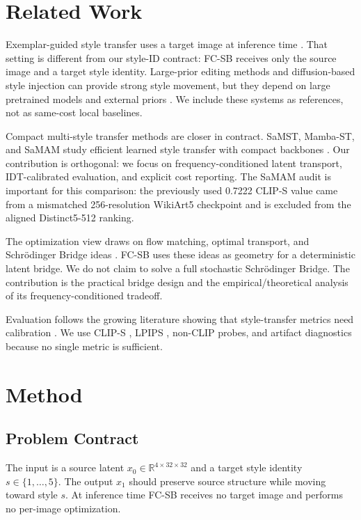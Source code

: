 \documentclass[letterpaper]{article}
\begin{document}
\section{Related Work}
Exemplar-guided style transfer uses a target image at inference time \cite{gatys2016image,huang2017adain,deng2022stytr2,hong2023aespa,huang2024aesfa}. That setting is different from our style-ID contract: FC-SB receives only the source image and a target style identity. Large-prior editing methods and diffusion-based style injection can provide strong style movement, but they depend on large pretrained models and external priors \cite{zhang2024artbank,chung2024styleid,xu2025stylessp}. We include these systems as references, not as same-cost local baselines.

Compact multi-style transfer methods are closer in contract. SaMST, Mamba-ST, and SaMAM study efficient learned style transfer with compact backbones \cite{liu2024samst,botti2025mambast,liu2025samam}. Our contribution is orthogonal: we focus on frequency-conditioned latent transport, IDT-calibrated evaluation, and explicit cost reporting. The SaMAM audit is important for this comparison: the previously used 0.7222 CLIP-S value came from a mismatched 256-resolution WikiArt5 checkpoint and is excluded from the aligned Distinct5-512 ranking.

The optimization view draws on flow matching, optimal transport, and Schr\"odinger Bridge ideas \cite{lipman2023flow,liu2023flow,peyre2019computational,leonard2014survey,chen2021schrodinger,bernoully2024schrodinger}. FC-SB uses these ideas as geometry for a deterministic latent bridge. We do not claim to solve a full stochastic Schr\"odinger Bridge. The contribution is the practical bridge design and the empirical/theoretical analysis of its frequency-conditioned tradeoff.

Evaluation follows the growing literature showing that style-transfer metrics need calibration \cite{zhou2024comprehensiveeval,yeh2020calibrated,wright2022artfid,yang2022artfid}. We use CLIP-S \cite{radford2021clip}, LPIPS \cite{zhang2018lpips}, non-CLIP probes, and artifact diagnostics because no single metric is sufficient.

\section{Method}
\subsection{Problem Contract}
The input is a source latent $x_0\in\mathbb{R}^{4\times32\times32}$ and a target style identity $s\in\{1,\ldots,5\}$. The output $x_1$ should preserve source structure while moving toward style $s$. At inference time FC-SB receives no target image and performs no per-image optimization.
\end{document}
